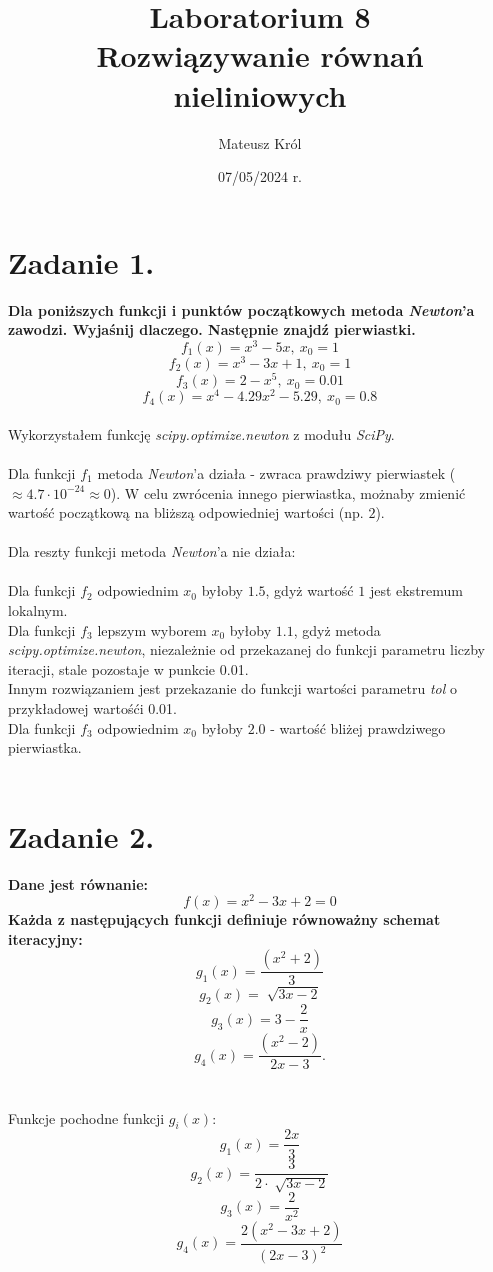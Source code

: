 \documentclass{article}
\title{%
Laboratorium 8\\
  \huge Rozwiązywanie równań nieliniowych}
\author{Mateusz Król}
\date{07/05/2024 r.}
\begin{document}
\maketitle

 
\section*{Zadanie 1.}
\textbf{Dla poniższych funkcji i punktów początkowych metoda 
\textit{Newton}'a
zawodzi. Wyjaśnij dlaczego. Następnie znajdź pierwiastki.
$$f_1(x) = x^3-5x,\ x_0=1$$
$$f_2(x) = x^3-3x+1,\ x_0=1$$
$$f_3(x) = 2-x^5,\ x_0=0.01$$
$$f_4(x) = x^4-4.29x^2-5.29,\ x_0=0.8$$} \\
\null\quad
Wykorzystałem funkcję \textit{scipy.optimize.newton} z modułu
\textit{SciPy}. \\\\
Dla funkcji $f_1$ metoda \textit{Newton}'a działa - zwraca prawdziwy
pierwiastek ($\approx 4.7 \cdot 10^{-24} \approx 0$). W celu zwrócenia
innego pierwiastka, możnaby zmienić wartość początkową na bliższą
odpowiedniej wartości (np. $2$). \\\\
Dla reszty funkcji metoda \textit{Newton}'a nie działa: \\\\
Dla funkcji $f_2$ odpowiednim $x_0$ byłoby $1.5$, gdyż wartość $1$ jest
ekstremum lokalnym. \\
Dla funkcji $f_3$ lepszym wyborem $x_0$ byłoby $1.1$, gdyż metoda \textit{scipy.optimize.newton},
niezależnie od przekazanej do funkcji parametru liczby iteracji, stale pozostaje w punkcie 0.01. \\
Innym rozwiązaniem jest przekazanie do funkcji wartości parametru \textit{tol} o przykładowej
wartośći 0.01. \\
Dla funkcji $f_3$ odpowiednim $x_0$ byłoby $2.0$ - wartość bliżej 
prawdziwego pierwiastka. \\\\

\section*{Zadanie 2.}
\textbf{Dane jest równanie: $$f(x)=x^2-3x+2=0$$
Każda z następujących funkcji definiuje równoważny schemat iteracyjny:
$$g_1(x)=\frac{(x^2+2)}{3}$$
$$g_2(x)=\sqrt[]{3x-2}$$
$$g_3(x)=3-\frac{2}{x}$$
$$g_4(x)=\frac{(x^2-2)}{2x-3}.$$
}
\\\\
\null\quad Funkcje pochodne funkcji $g_i(x)$:
$$g_1(x)=\frac{2x}{3}$$
$$g_2(x)=\frac{3}{2\cdot \sqrt[]{3x-2}}$$
$$g_3(x)=\frac{2}{x^2}$$
$$g_4(x)=\frac{2(x^2-3x+2)}{(2x-3)^2}$$
\end{document}
